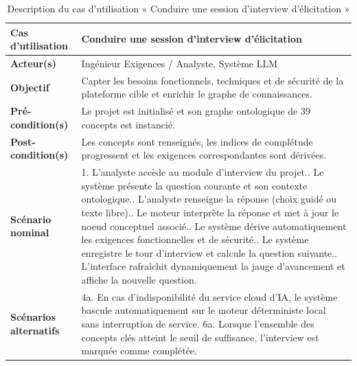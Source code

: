 \begin{table}[H]
\centering
\caption{Description du cas d'utilisation « Conduire une session d'interview d'élicitation »}
\label{tab:uc_interview}
\begin{tabularx}{\textwidth}{|l|X|}
\hline
\rowcolor{focpgreen!18}
\textbf{Cas d'utilisation} & Conduire une session d'interview d'élicitation \\
\hline
\textbf{Acteur(s)} & Ingénieur Exigences / Analyste, Système LLM \\
\hline
\textbf{Objectif} & Capter les besoins fonctionnels, techniques et de sécurité de la plateforme cible et enrichir le graphe de connaissances. \\
\hline
\textbf{Pré-condition(s)} & Le projet est initialisé et son graphe ontologique de 39 concepts est instancié. \\
\hline
\textbf{Post-condition(s)} & Les concepts sont renseignés, les indices de complétude progressent et les exigences correspondantes sont dérivées. \\
\hline
\textbf{Scénario nominal} & 
1. L'analyste accède au module d'interview du projet.\newline
2. Le système présente la question courante et son contexte ontologique.\newline
3. L'analyste renseigne la réponse (choix guidé ou texte libre).\newline
4. Le moteur interprète la réponse et met à jour le noeud conceptuel associé.\newline
5. Le système dérive automatiquement les exigences fonctionnelles et de sécurité.\newline
6. Le système enregistre le tour d'interview et calcule la question suivante.\newline
7. L'interface rafraîchit dynamiquement la jauge d'avancement et affiche la nouvelle question. \\
\hline
\textbf{Scénarios alternatifs} & 
4a. En cas d'indisponibilité du service cloud d'IA, le système bascule automatiquement sur le moteur déterministe local sans interruption de service.\newline
6a. Lorsque l'ensemble des concepts clés atteint le seuil de suffisance, l'interview est marquée comme complétée. \\
\hline
\end{tabularx}
\end{table}

